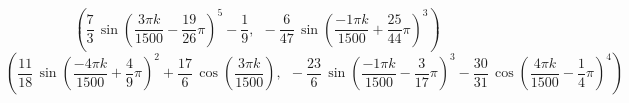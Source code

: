 \[
\left( \frac{7}{3}\,\sin\!\left(\frac{3\pi k}{1500} - \frac{19}{26}\pi\right)^{5} - \frac{1}{9},\ \ -\frac{6}{47}\,\sin\!\left(\frac{-1\pi k}{1500} + \frac{25}{44}\pi\right)^{3} \right)
\]
\[
\left( \frac{11}{18}\,\sin\!\left(\frac{-4\pi k}{1500} + \frac{4}{9}\pi\right)^{2} + \frac{17}{6}\,\cos\!\left(\frac{3\pi k}{1500}\right),\ \ -\frac{23}{6}\,\sin\!\left(\frac{-1\pi k}{1500} - \frac{3}{17}\pi\right)^{3} - \frac{30}{31}\,\cos\!\left(\frac{4\pi k}{1500} - \frac{1}{4}\pi\right)^{4} \right)
\]
